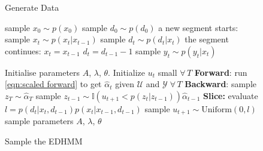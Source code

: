 \begin{figure*}[ttt!]
\begin{minipage}[t]{2in}
\begin{algorithm}[H]
    \caption{Generate Data}
    \label{alg:gen}
    \begin{algorithmic}
        \STATE sample $x_0 \sim p(x_0)$
        \STATE sample $d_0 \sim p(d_0)$
                \STATE a new segment starts:
                \STATE sample $x_t \sim p(x_t | x_{t-1})$
                \STATE sample $d_t \sim p(d_t | x_t)$
            \ELSE
                \STATE the segment continues:
                \STATE $x_t = x_{t-1}$
                \STATE $d_t = d_{t-1} - 1$
            \ENDIF
        \STATE sample $y_t \sim p(y_t | x_t)$
        \ENDFOR
    \end{algorithmic}
\end{algorithm} 
 \end{minipage}
 \hfill
 \begin{minipage}[t]{3.3in}
\begin{algorithm}[H]
    \caption{Sample the EDHMM}
    \label{alg:beam}
    \begin{algorithmic}
\STATE Initialise parameters $A$, $\lambda$, $\theta.$ Initialize $u_t$ small $\forall\, T$
    \STATE \textbf{Forward}: run \eqref{eqn:scaled forward} to get $\hat{\alpha}_t$ given $\mathcal{U}$ and $\mathcal{Y} \; \forall\, T$
    \STATE \textbf{Backward}: sample $z_T \sim \hat{\alpha}_T$
        \STATE sample $z_{t-1} \sim \mathbb{I}(u_{t+1} < p(z_{t} | z_{t-1}))\hat{\alpha}_{t-1}$
    \ENDFOR
\STATE \textbf{Slice:}
    \STATE evaluate $l = p(d_t|x_t,d_{t-1})p(x_t|x_{t-1},d_{t-1})$
    \STATE sample $u_{t+1} \sim \mathrm{Uniform}(0,l)$
    \ENDFOR
\STATE sample parameters $A$, $\lambda$, $\theta$
\ENDFOR
\end{algorithmic}
\end{algorithm}
\end{minipage}
 \hfill
\end{figure*}